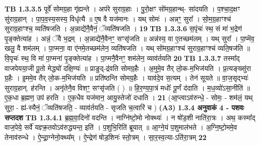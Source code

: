 \documentclass[17pt]{extarticle}
\begin{document}
                                \textbf{ TB 1.3.3.5} \newline
                  पूर्वे॑ सोमग्र॒हा गृ॑ह्यन्ते । अप॑रे सुराग्र॒हाः । पु॒रो॒क्षꣳ सो॑मग्र॒हान्थ्- सा॑दयति । प॒श्चा॒द॒क्षꣳ सु॑राग्र॒हान् । पा॒प॒व॒स्य॒सस्य॒ विधृ॑त्यै ॥ ए॒ष वै यज॑मानः । यथ् सोमः॑ । अन्नꣳ॒॒ सुरा᳚ । सो॒म॒ग्र॒हाꣳश्च॑ सुराग्र॒हाꣳश्च॒ व्यति॑षजति । अ॒न्नाद्ये॑नै॒वैनं॒ ॅव्यति॑षजति । \textbf{ 19} \newline
                  \newline
                                \textbf{ TB 1.3.3.6} \newline
                  स॒पृंचः॑ स्थ॒ सं मा॑ भ॒द्रेण॑ पृ॒ङ्क्तेत्या॑ह । अन्नं॒ ॅवै भ॒द्रम् । अ॒न्नाद्ये॑नै॒वैनꣳ॒॒ सꣳसृ॑जति ॥ अन्न॑स्य॒ वा ए॒तच्छम॑लम् । यथ् सुरा᳚ । पा॒प्मॆव॒ खलु॒ वै शम॑लम् । पा॒प्मना॒ वा ए॑नमे॒तच्छम॑लेन॒ व्यति॑षजति । यथ् सो॑मग्र॒हाꣳश्च॑ सुराग्र॒हाꣳश्च॑ व्यति॒षज॑ति ॥ वि॒पृचः॑ स्थ॒ वि मा॑ पा॒प्मना॑ पृ॒ङ्क्तेत्या॑ह । पा॒प्मनै॒वैनꣳ॒॒ शम॑लेन॒ व्याव॑र्तयति \textbf{ 20} \newline
                  \newline
                                \textbf{ TB 1.3.3.7} \newline
                  तस्मा᳚द् वाजपेयया॒जी पू॒तो मेद्ध्यो॑ दक्षि॒ण्यः॑ ॥ प्राङुद्-द्र॑वति सोमग्र॒हैः । अ॒मुमे॒व तैर् लो॒क-म॒भिज॑यति । प्र॒त्यङ्ख्सु॑रा ग्र॒हैः । इ॒ममे॒व तैर् लो॒क-म॒भिज॑यति ॥ प्रति॑ष्ठन्ति सोमग्र॒हैः । याव॑दे॒व स॒त्यम् । तेन॑ सूयते ॥ वा॒ज॒सृद्भ्यः॑ सुराग्र॒हान्. ह॑रन्ति । अनृ॑तेनै॒व विशꣳ॒॒ सꣳसृ॑जति ( ) ॥ हि॒र॒ण्य॒पा॒त्रं मधोः᳚ पू॒र्णं द॑दाति । म॒ध॒व्यो॑ऽसा॒नीति॑ ॥ ए॒क॒धा ब्र॒ह्मण॒ उप॑ हरति । ए॒क॒धैव यज॑मान॒ आयु॒स्तेजो॑ दधाति । \textbf{ 21} \newline
                  \newline
                                    (आ॒प्त्वाऽव॑रुन्धे॒ - सोमः॒ - शम॑लं॒ यथ् सुरा॒ - ह्य॑-स्यैनं॒ ॅव्यति॑षजति॒ - व्याव॑र्तयति - सृजति च॒त्वारि॑ च ) \textbf{(A3)} \newline \newline
                \textbf{ 1.3.4      अनुवाकं   4 - पशवः सप्तदश} \newline
                                \textbf{ TB 1.3.4.1} \newline
                  ब्र॒ह्म॒वा॒दिनो॑ वदन्ति । नाग्नि॑ष्टो॒मो नोक्थ्यः॑ । न षो॑ड॒शी नाति॑रा॒त्रः । अथ॒ कस्मा᳚द् वाज॒पेये॒ सर्वे॑ यज्ञ्क्र॒तवोऽव॑रुद्ध्यन्त॒ इति॑ । प॒शुभि॒रिति॑ ब्रूयात् ॥ आ॒ग्ने॒यं प॒शुमाल॑भते । अ॒ग्नि॒ष्टो॒ममे॒व तेनाव॑रुन्धे । ऐ॒न्द्रा॒ग्नेनो॒क्थ्य᳚म् । ऐ॒न्द्रेण॑ षोड॒शिनः॑ स्तो॒त्रम् । सा॒र॒स्व॒त्या-ऽति॑रा॒त्रम् \textbf{ 22} \newline
\end{document}
